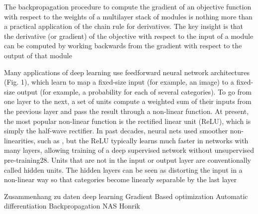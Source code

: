 The backpropagation procedure to compute the gradient of an objective function with respect to the weights of a multilayer stack of modules is nothing more than a practical application of the chain rule for derivatives. The key insight is that the derivative (or gradient) of the objective with respect to the input of a module can be computed by working backwards from the gradient with respect to the output of that module

Many applications of deep learning use feedforward neural network architectures (Fig. 1), which learn to map a fixed-size input (for example, an image) to a fixed-size output (for example, a probability for each of several categories). To go from one layer to the next, a set of units compute a weighted sum of their inputs from the previous layer and pass the result through a non-linear function. At present, the most popular non-linear function is the rectified linear unit (ReLU), which is simply the half-wave rectifier. In past decades, neural nets used smoother non-linearities, such as , but the ReLU typically learns much faster in networks with many layers, allowing training of a deep supervised network without unsupervised pre-training28. Units that are not in the input or output layer are conventionally called hidden units. The hidden layers can be seen as distorting the input in a non-linear way so that categories become linearly separable by the last layer 


Zusammenhang zu daten
deep learning
Gradient Based optimization
Automatic differentiation
Backpropagation 
NAS
Honrik 